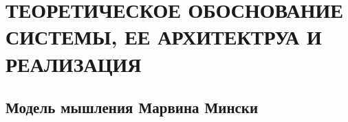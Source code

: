 \chapter{ТЕОРЕТИЧЕСКОЕ ОБОСНОВАНИЕ СИСТЕМЫ, ЕЕ АРХИТЕКТРУА И РЕАЛИЗАЦИЯ}
\section{Модель мышления Марвина Мински}